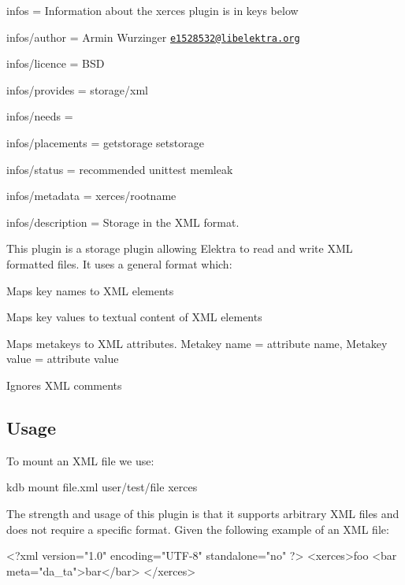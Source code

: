 
\begin{DoxyItemize}
\item infos = Information about the xerces plugin is in keys below
\item infos/author = Armin Wurzinger \href{mailto:e1528532@libelektra.org}{\tt e1528532@libelektra.\+org}
\item infos/licence = B\+SD
\item infos/provides = storage/xml
\item infos/needs =
\item infos/placements = getstorage setstorage
\item infos/status = recommended unittest memleak
\item infos/metadata = xerces/rootname
\item infos/description = Storage in the X\+ML format.
\end{DoxyItemize}

This plugin is a storage plugin allowing Elektra to read and write X\+ML formatted files. It uses a general format which\+:


\begin{DoxyItemize}
\item Maps key names to X\+ML elements
\item Maps key values to textual content of X\+ML elements
\item Maps metakeys to X\+ML attributes. Metakey name = attribute name, Metakey value = attribute value
\item Ignores X\+ML comments
\end{DoxyItemize}

\subsection*{Usage}

To mount an X\+ML file we use\+: \begin{DoxyVerb}kdb mount file.xml user/test/file xerces
\end{DoxyVerb}


The strength and usage of this plugin is that it supports arbitrary X\+ML files and does not require a specific format. Given the following example of an X\+ML file\+:


\begin{DoxyCode}
<?\textcolor{keyword}{xml} \textcolor{keyword}{version}=\textcolor{stringliteral}{"1.0"} \textcolor{keyword}{encoding}=\textcolor{stringliteral}{"UTF-8"} \textcolor{keyword}{standalone}=\textcolor{stringliteral}{"no"} ?>
<\textcolor{keywordtype}{xerces}>\textcolor{keyword}{foo}
  <\textcolor{keywordtype}{bar} \textcolor{keyword}{meta}=\textcolor{stringliteral}{"da\_ta"}>\textcolor{keyword}{bar}</\textcolor{keywordtype}{bar}>
</\textcolor{keywordtype}{xerces}>
\end{DoxyCode}


